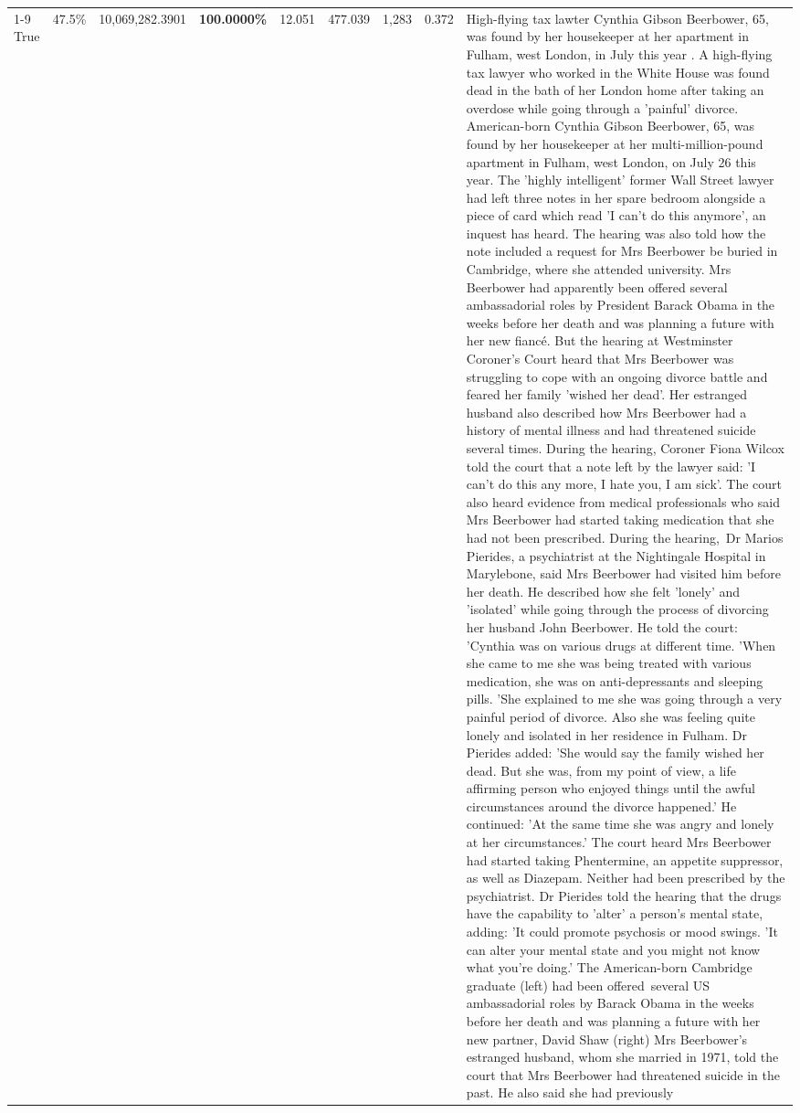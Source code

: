 \begin{table}[H]
\begin{tabular}{lllrlllll}
\cline{1-9}
True & 47.5\% & 10,069,282.3901 & \bfseries \color{red} 100.0000\% & 12.051 & 477.039 & 1,283 & 0.372 & High-flying tax lawter Cynthia Gibson Beerbower, 65, was found by her housekeeper at her apartment in Fulham, west London, in July this year . A high-flying tax lawyer who worked in the White House was found dead in the bath of her London home after taking an overdose while going through a 'painful' divorce. American-born Cynthia Gibson Beerbower, 65, was found by her housekeeper at her multi-million-pound apartment in Fulham, west London, on July 26 this year. The 'highly intelligent' former Wall Street lawyer had left three notes in her spare bedroom alongside a piece of card which read 'I can't do this anymore', an inquest has heard. The hearing was also told how the note included a request for Mrs Beerbower be buried in Cambridge, where she attended university. Mrs Beerbower had apparently been offered several ambassadorial roles by President Barack Obama in the weeks before her death and was planning a future with her new fiancé. But the hearing at Westminster Coroner's Court heard that Mrs Beerbower was struggling to cope with an ongoing divorce battle and feared her family 'wished her dead'. Her estranged husband also described how Mrs Beerbower had a history of mental illness and had threatened suicide several times. During the hearing, Coroner Fiona Wilcox told the court that a note left by the lawyer said: 'I can't do this any more, I hate you, I am sick'. The court also heard evidence from medical professionals who said Mrs Beerbower had started taking medication that she had not been prescribed. During the hearing, Dr Marios Pierides, a psychiatrist at the Nightingale Hospital in Marylebone, said Mrs Beerbower had visited him before her death. He described how she felt 'lonely' and 'isolated' while going through the process of divorcing her husband John Beerbower. He told the court: 'Cynthia was on various drugs at different time. 'When she came to me she was being treated with various medication, she was on anti-depressants and sleeping pills. 'She explained to me she was going through a very painful period of divorce. Also she was feeling quite lonely and isolated in her residence in Fulham. Dr Pierides added: 'She would say the family wished her dead. But she was, from my point of view, a life affirming person who enjoyed things until the awful circumstances around the divorce happened.' He continued: 'At the same time she was angry and lonely at her circumstances.' The court heard Mrs Beerbower had started taking Phentermine, an appetite suppressor, as well as Diazepam. Neither had been prescribed by the psychiatrist. Dr Pierides told the hearing that the drugs have the capability to 'alter' a person's mental state, adding: 'It could promote psychosis or mood swings. 'It can alter your mental state and you might not know what you're doing.' The American-born Cambridge graduate (left) had been offered several US ambassadorial roles by Barack Obama in the weeks before her death and was planning a future with her new partner, David Shaw (right) Mrs Beerbower's estranged husband, whom she married in 1971, told the court that Mrs Beerbower had threatened suicide in the past. He also said she had previously 
\end{tabular}
\end{table}
